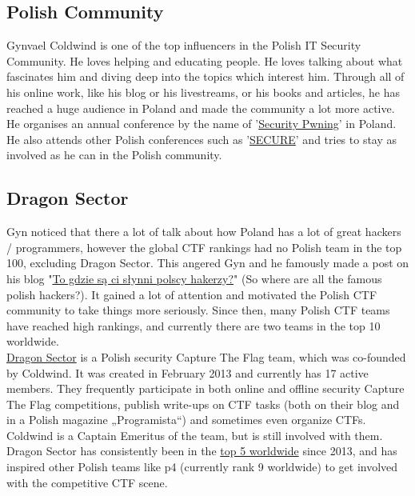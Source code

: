\documentclass[11pt]{article}
\begin{document}
\subsection{Polish Community}
Gynvael Coldwind is one of the top influencers in the Polish IT Security Community. He loves helping and educating people. He loves talking about what fascinates him and diving deep into the topics which interest him. Through all of his online work, like his blog or his livestreams, or his books and articles, he has reached a huge audience in Poland and made the community a lot more active. He organises an annual conference by the name of '\href{https://www.instytutpwn.pl/konferencja/pwning/}{Security Pwning}' in Poland. He also attends other Polish conferences such as '\href{https://www.secure.edu.pl/en/}{SECURE}' and tries to stay as involved as he can in the Polish community.

\subsection{Dragon Sector}
Gyn noticed that there a lot of talk about how Poland has a lot of great hackers / programmers, however the global CTF rankings had no Polish team in the top 100, excluding Dragon Sector. This angered Gyn and he famously made a post on his blog "\href{https://gynvael.coldwind.pl/?id=499}{To gdzie są ci słynni polscy hakerzy?}" (So where are all the famous polish hackers?). It gained a lot of attention and motivated the Polish CTF community to take things more seriously. Since then, many Polish CTF teams have reached high rankings, and currently there are two teams in the top 10 worldwide. \\

\href{https://dragonsector.pl/}{Dragon Sector} is a Polish security Capture The Flag team, which was co-founded by Coldwind. It was created in February 2013 and currently has 17 active members. They frequently participate in both online and offline security Capture The Flag competitions, publish write-ups on CTF tasks (both on their blog and in a Polish magazine „Programista“) and sometimes even organize CTFs. Coldwind is a Captain Emeritus of the team, but is still involved with them. Dragon Sector has consistently been in the \href{https://ctftime.org/stats/2019}{top 5 worldwide} since 2013, and has inspired other Polish teams like p4 (currently rank 9 worldwide) to get involved with the competitive CTF scene.
\end{document}
